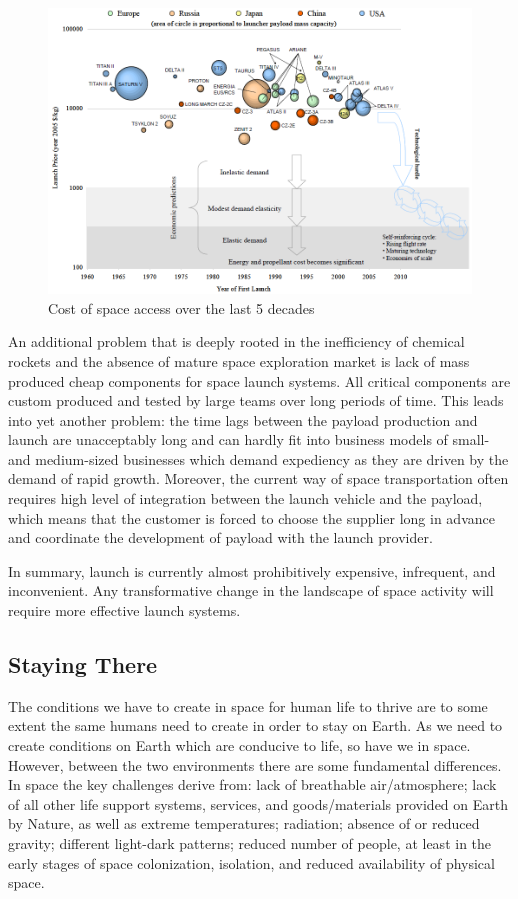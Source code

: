 \documentclass[letter,11pt]{article}
\begin{document}
\begin{figure}[bt!]
	\centering
	\includegraphics[width=\textwidth]{launch-cost}
	\caption{Cost of space access over the last 5 decades}
	\label{launch-cost}
\end{figure}

An additional problem that is deeply rooted in the inefficiency of chemical
rockets and the absence of mature space exploration market is lack of mass
produced cheap components for space launch systems. All critical components are
custom produced and tested by large teams over long periods of time. This leads
into yet another problem: the time lags between the payload production and
launch are unacceptably long and can hardly fit into business models of small-
and medium-sized businesses which demand expediency as they are driven by the
demand of rapid growth. Moreover, the current way of space transportation often
requires high level of integration between the launch vehicle and the payload,
which means that the customer is forced to choose the supplier long in advance
and coordinate the development of payload with the launch provider. 

In summary, launch is currently almost prohibitively expensive, infrequent, and
inconvenient. Any transformative change in the landscape of space activity will
require more effective launch systems.

\subsection{Staying There \label{staying-there}}
\label{ps-staying-there}

The conditions we have to create in space for human life to thrive are to some
extent the same humans need to create in order to stay on Earth. As we need to
create conditions on Earth which are conducive to life, so have we in space.
However, between the two environments there are some fundamental differences.
In space the key challenges derive from: lack of breathable air/atmosphere;
lack of all other life support systems, services, and goods/materials provided
on Earth by Nature, as well as extreme temperatures; radiation; absence of or
reduced gravity; different light-dark patterns; reduced number of people, at
least in the early stages of space colonization, isolation, and reduced
availability of physical space.
 
\end{document}

